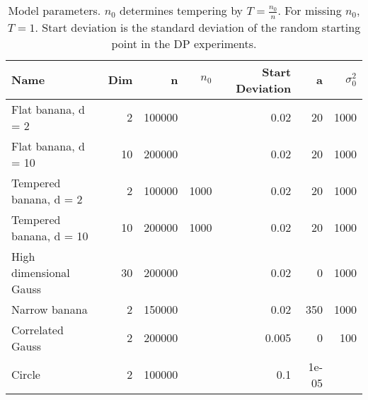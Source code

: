 \begin{table}
\centering
\caption{
            Model parameters. $n_0$ determines tempering by \(T=\frac{n_0}{n}\).
            For missing $n_0$, \(T = 1\). Start deviation is the standard deviation
            of the random starting point in the DP experiments.
            }
\label{model_params_table}
\begin{tabular}{lrrrrrr}
\toprule
                    Name &  Dim &       n &  $n_0$ &  Start Deviation &     a &  $\sigma^2_0$ \\
\midrule
      Flat banana, d = 2 &    2 &  100000 &        &             0.02 &    20 &          1000 \\
     Flat banana, d = 10 &   10 &  200000 &        &             0.02 &    20 &          1000 \\
  Tempered banana, d = 2 &    2 &  100000 &   1000 &             0.02 &    20 &          1000 \\
 Tempered banana, d = 10 &   10 &  200000 &   1000 &             0.02 &    20 &          1000 \\
  High dimensional Gauss &   30 &  200000 &        &             0.02 &     0 &          1000 \\
           Narrow banana &    2 &  150000 &        &             0.02 &   350 &          1000 \\
        Correlated Gauss &    2 &  200000 &        &            0.005 &     0 &           100 \\
                  Circle &    2 &  100000 &        &              0.1 & 1e-05 &               \\
\bottomrule
\end{tabular}
\end{table}
